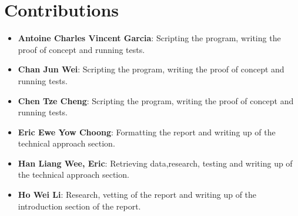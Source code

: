 \documentclass{article}
\begin{document}
    \section{Contributions}
    \begin{itemize}
        \item \textbf{Antoine Charles Vincent Garcia}: 
        Scripting the program, writing the proof of concept and running tests.
        \item \textbf{Chan Jun Wei}: 
        Scripting the program, writing the proof of concept and running tests.
        \item \textbf{Chen Tze Cheng}: 
        Scripting the program, writing the proof of concept and running tests.
        \item \textbf{Eric Ewe Yow Choong}: 
        Formatting the report and writing up of the technical approach section.
        \item \textbf{Han Liang Wee, Eric}: 
        Retrieving data,research, testing and writing up of the technical approach section.
        \item \textbf{Ho Wei Li}: 
        Research, vetting of the report and writing up of the introduction section of the report. \\
    \end{itemize}
    
    
    {\scriptsize }
\end{document}
